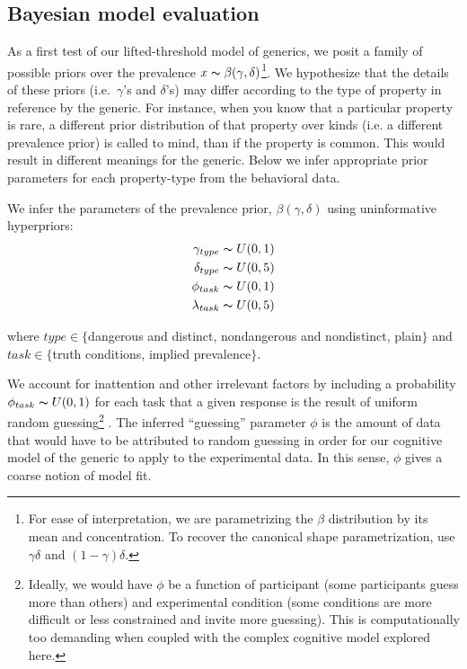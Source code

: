 \documentclass[10pt,letterpaper]{article}
\begin{document}
\subsection{Bayesian model evaluation}
\label{sec:model1}

As a first test of our lifted-threshold model of generics, we posit a family of possible priors over the prevalence $x \thicksim \beta(\gamma,\delta)$\footnote{For ease of interpretation, we are parametrizing the $\beta$ distribution by its mean and concentration. To recover the canonical shape parametrization, use $\gamma \delta$ and $(1-\gamma)\delta$.}. We hypothesize that the details of these priors (i.e.~$\gamma$'s and $\delta$'s) may differ according to the type of property in reference by the generic. For instance, when you know that a particular property is rare, a different prior distribution of that property over kinds (i.e. a different prevalence prior) is called to mind, than if the property is common. This would result in different meanings for the generic. Below we infer appropriate prior parameters for each property-type from the behavioral data.

We infer the parameters of the prevalence prior, $\beta(\gamma,\delta)$ using uninformative hyperpriors:
%
\begin{align*}
\gamma_{type} \thicksim U(0,1) \\
\delta_{type} \thicksim U(0,5) \\
\phi_{task} \thicksim U(0,1) \\
\lambda_{task} \thicksim U(0,5)
\end{align*}

where $type \in \{$dangerous and distinct, nondangerous and nondistinct, plain$\}$ and $task \in \{$truth conditions, implied prevalence$\}$.

We account for inattention and other irrelevant factors by including a probability $\phi_{task}\thicksim U(0,1)$ for each task that a given response is the result of uniform random guessing\footnote{Ideally, we would have $\phi$ be a function of participant (some participants guess more than others) and experimental condition (some conditions are more difficult or less constrained and invite more guessing). This is computationally too demanding when coupled with the complex cognitive model explored here.}  \cite{LW2014}.
The inferred ``guessing'' parameter $\phi$ is the amount of data that would have to be attributed to random guessing in order for our cognitive model of the generic to apply to the experimental data. In this sense, $\phi$ gives a coarse notion of model fit. 
\end{document}
